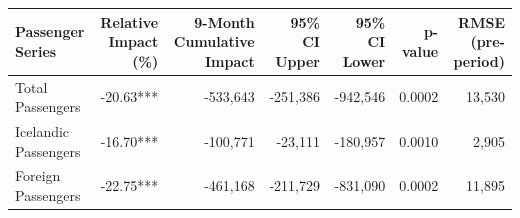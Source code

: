 
\begin{tabular}{lrrrrrr}
\toprule
Passenger Series & Relative Impact (\%) & 9-Month Cumulative Impact & 95\% CI Upper & 95\% CI Lower & p-value & RMSE (pre-period)\\
\midrule
Total Passengers & -20.63*** & -533,643 & -251,386 & -942,546 & 0.0002 & 13,530\\
Icelandic Passengers & -16.70*** & -100,771 & -23,111 & -180,957 & 0.0010 & 2,905\\
Foreign Passengers & -22.75*** & -461,168 & -211,729 & -831,090 & 0.0002 & 11,895\\
\bottomrule
\end{tabular}
